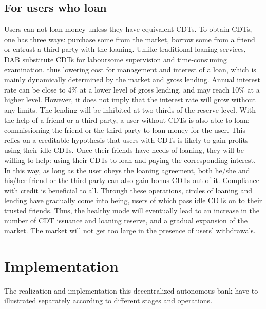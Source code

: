 \documentclass[a4paper, 10pt, conference]{ieeeconf} %
\begin{document}
\subsection {For users who loan}
Users can not loan money unless they have equivalent CDTs. To obtain CDTs, one has three ways: purchase some from the market, borrow some from a friend or entrust a third party with the loaning. 
Unlike traditional loaning services, DAB substitute CDTs for laboursome supervision and time-consuming examination, thus lowering cost for management and interest of a loan, which is mainly dynamically determined by the market and gross lending. Annual interest rate can be close to 4\% at a lower level of gross lending, and may reach 10\% at a higher level. However, it does not imply that the interest rate will grow without any limits. The lending will be inhibited at two thirds of the reserve level. 
With the help of a friend or a third party, a user without CDTs is also able to loan: commissioning the friend or the third party to loan money for the user. This relies on a creditable hypothesis that users with CDTs is likely to gain profits using their idle CDTs. Once their friends have needs of loaning, they will be willing to help: using their CDTs to loan and paying the corresponding interest. In this way, as long as the user obeys the loaning agreement, both he/she and his/her friend or the third party can also gain bonus CDTs out of it. Compliance with credit is beneficial to all. Through these operations, circles of loaning and lending have gradually come into being, users of which pass idle CDTs on to their trusted friends. Thus, the healthy mode will eventually lead to an increase in the number of CDT issuance and loaning reserve, and a gradual expansion of the market. The market will not get too large in the presence of users' withdrawals.

\section{Implementation}
The realization and implementation this decentralized autonomous bank have to illustrated separately according to different stages and operations.
\end{document}
